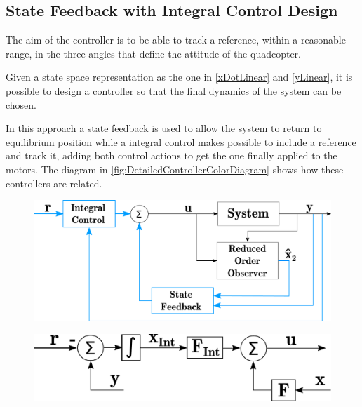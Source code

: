 \subsection{State Feedback with Integral Control Design}
The aim of the controller is to be able to track a reference, within a reasonable range, in the three angles that define the attitude of the quadcopter.

Given a state space representation as the one in \autoref{xDotLinear} and \autoref{yLinear}, it is possible to design a controller so that the final dynamics of the system can be chosen.

In this approach a state feedback is used to allow the system to return to equilibrium position while a integral control makes possible to include a reference and track it, adding both control actions to get the one finally applied to the motors. The diagram in \autoref{fig:DetailedControllerColorDiagram} shows how these controllers are related.
%
\begin{minipage}{\linewidth}
	\begin{minipage}{0.6\linewidth}
		\begin{figure}[H]
			\includegraphics[scale=.35]{figures/ControllerColorDiagram}
			\centering			
			\label{fig:ControllerColorDiagram}
		\end{figure}
	\end{minipage}
	\hspace{0.03\linewidth}
	\begin{minipage}{0.4\linewidth}
		\begin{figure}[H]\vspace{20mm}
			\includegraphics[scale=.35]{figures/DetailedControllerColorDiagram}
			\centering \vspace{7mm}
			\label{fig:DetailedControllerColorDiagram}
		\end{figure}
	\end{minipage}
\end{minipage}


